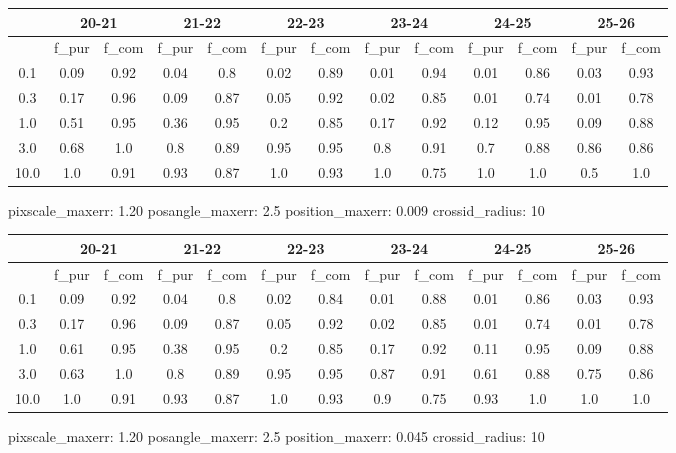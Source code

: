\documentclass{article}
\begin{document}
\begin{figure}[H]
\centering
\begin{tabular}{|c|c|c|c|c|c|c|c|c|c|c|c|c|}
\hline
\multicolumn{1}{|c|}{} & \multicolumn{2}{|c|}{20-21} & \multicolumn{2}{|c|}{21-22} & \multicolumn{2}{|c|}{22-23} & \multicolumn{2}{|c|}{23-24} & \multicolumn{2}{|c|}{24-25} & \multicolumn{2}{|c|}{25-26}\\
\hline \hline
 & f\_pur & f\_com & f\_pur & f\_com & f\_pur & f\_com & f\_pur & f\_com & f\_pur & f\_com & f\_pur & f\_com \\
\hline
0.1 & 0.09 & 0.92 & 0.04 & 0.8 & 0.02 & 0.89 & 0.01 & 0.94 & 0.01 & 0.86 & 0.03 & 0.93\\
\hline
0.3 & 0.17 & 0.96 & 0.09 & 0.87 & 0.05 & 0.92 & 0.02 & 0.85 & 0.01 & 0.74 & 0.01 & 0.78\\
\hline
1.0 & 0.51 & 0.95 & 0.36 & 0.95 & 0.2 & 0.85 & 0.17 & 0.92 & 0.12 & 0.95 & 0.09 & 0.88\\
\hline
3.0 & 0.68 & 1.0 & 0.8 & 0.89 & 0.95 & 0.95 & 0.8 & 0.91 & 0.7 & 0.88 & 0.86 & 0.86\\
\hline
10.0 & 1.0 & 0.91 & 0.93 & 0.87 & 1.0 & 0.93 & 1.0 & 0.75 & 1.0 & 1.0 & 0.5 & 1.0\\
\hline
\end{tabular}
\caption{pixscale\_maxerr: 1.20 posangle\_maxerr: 2.5 position\_maxerr: 0.009 crossid\_radius: 10}
\end{figure}

\begin{figure}[H]
\centering
\begin{tabular}{|c|c|c|c|c|c|c|c|c|c|c|c|c|}
\hline
\multicolumn{1}{|c|}{} & \multicolumn{2}{|c|}{20-21} & \multicolumn{2}{|c|}{21-22} & \multicolumn{2}{|c|}{22-23} & \multicolumn{2}{|c|}{23-24} & \multicolumn{2}{|c|}{24-25} & \multicolumn{2}{|c|}{25-26}\\
\hline \hline
 & f\_pur & f\_com & f\_pur & f\_com & f\_pur & f\_com & f\_pur & f\_com & f\_pur & f\_com & f\_pur & f\_com \\
\hline
0.1 & 0.09 & 0.92 & 0.04 & 0.8 & 0.02 & 0.84 & 0.01 & 0.88 & 0.01 & 0.86 & 0.03 & 0.93\\
\hline
0.3 & 0.17 & 0.96 & 0.09 & 0.87 & 0.05 & 0.92 & 0.02 & 0.85 & 0.01 & 0.74 & 0.01 & 0.78\\
\hline
1.0 & 0.61 & 0.95 & 0.38 & 0.95 & 0.2 & 0.85 & 0.17 & 0.92 & 0.11 & 0.95 & 0.09 & 0.88\\
\hline
3.0 & 0.63 & 1.0 & 0.8 & 0.89 & 0.95 & 0.95 & 0.87 & 0.91 & 0.61 & 0.88 & 0.75 & 0.86\\
\hline
10.0 & 1.0 & 0.91 & 0.93 & 0.87 & 1.0 & 0.93 & 0.9 & 0.75 & 0.93 & 1.0 & 1.0 & 1.0\\
\hline
\end{tabular}
\caption{pixscale\_maxerr: 1.20 posangle\_maxerr: 2.5 position\_maxerr: 0.045 crossid\_radius: 10}
\end{figure}
\end{document}
